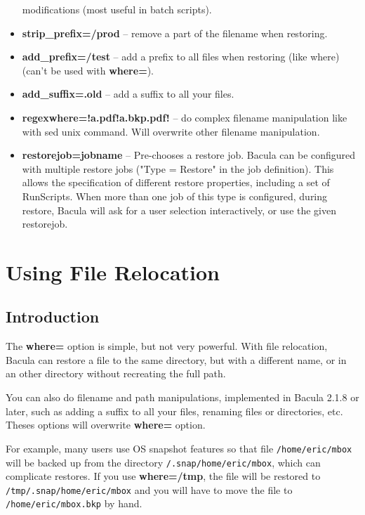 \begin{itemize}
   modifications (most useful in batch scripts). 
\item {\bf strip\_prefix=/prod} -- remove a part of the filename when restoring.
\item {\bf add\_prefix=/test} -- add a prefix to all files when restoring (like
  where) (can't be used with {\bf where=}).
\item {\bf add\_suffix=.old} -- add a suffix to all your files.
\item {\bf regexwhere=!a.pdf!a.bkp.pdf!} -- do complex filename manipulation
  like with sed unix command. Will overwrite other filename manipulation.
\item {\bf restorejob=jobname} -- Pre-chooses a restore job. Bacula can be
  configured with multiple restore jobs ("Type = Restore" in the job
  definition). This allows the specification of different restore properties,
  including a set of RunScripts. When more than one job of this type is
  configured, during restore, Bacula will ask for a user selection
  interactively, or use the given restorejob.
\end{itemize}

\label{restorefilerelocation}
\section{Using File Relocation}
\label{filerelocation}

\subsection{Introduction}

The \textbf{where=} option is simple, but not very powerful. With file
relocation, Bacula can restore a file to the same directory, but with a
different name, or in an other directory without recreating the full path.

You can also do filename and path manipulations, implemented in Bacula
2.1.8 or later, such as adding a suffix to all your files, renaming files
or directories, etc.  Theses options will overwrite {\bf where=} option.


For example, many users use OS snapshot features so that file
\texttt{/home/eric/mbox} will be backed up from the directory
\texttt{/.snap/home/eric/mbox}, which can complicate restores.  If you use
\textbf{where=/tmp}, the file will be restored to
\texttt{/tmp/.snap/home/eric/mbox} and you will have to move the file to
\texttt{/home/eric/mbox.bkp} by hand.  

